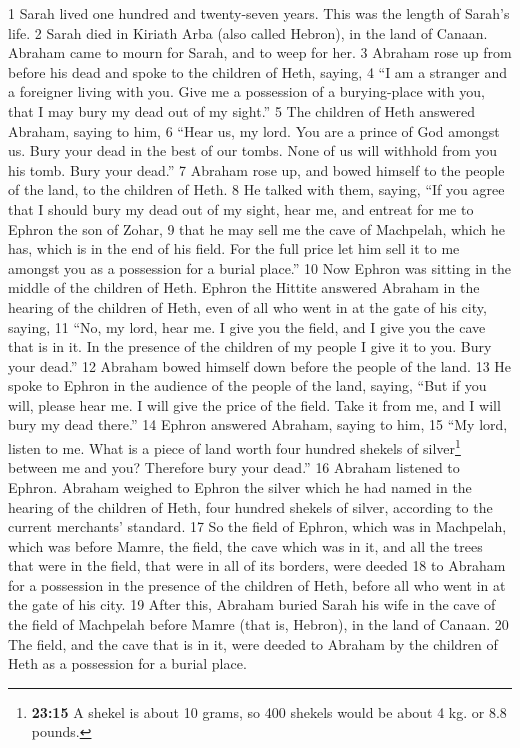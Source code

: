 {1} Sarah lived one hundred and twenty-seven years. This was the length
of Sarah's life. {2} Sarah died in Kiriath Arba (also called Hebron), in
the land of Canaan. Abraham came to mourn for Sarah, and to weep for
her. {3} Abraham rose up from before his dead and spoke to the children
of Heth, saying, {4} ``I am a stranger and a foreigner living with you.
Give me a possession of a burying-place with you, that I may bury my
dead out of my sight.'' {5} The children of Heth answered Abraham,
saying to him, {6} ``Hear us, my lord. You are a prince of God amongst
us. Bury your dead in the best of our tombs. None of us will withhold
from you his tomb. Bury your dead.'' {7} Abraham rose up, and bowed
himself to the people of the land, to the children of Heth. {8} He
talked with them, saying, ``If you agree that I should bury my dead out
of my sight, hear me, and entreat for me to Ephron the son of Zohar, {9}
that he may sell me the cave of Machpelah, which he has, which is in the
end of his field. For the full price let him sell it to me amongst you
as a possession for a burial place.'' {10} Now Ephron was sitting in the
middle of the children of Heth. Ephron the Hittite answered Abraham in
the hearing of the children of Heth, even of all who went in at the gate
of his city, saying, {11} ``No, my lord, hear me. I give you the field,
and I give you the cave that is in it. In the presence of the children
of my people I give it to you. Bury your dead.'' {12} Abraham bowed
himself down before the people of the land. {13} He spoke to Ephron in
the audience of the people of the land, saying, ``But if you will,
please hear me. I will give the price of the field. Take it from me, and
I will bury my dead there.'' {14} Ephron answered Abraham, saying to
him, {15} ``My lord, listen to me. What is a piece of land worth four
hundred shekels of silver\footnote{\textbf{23:15} A shekel is about 10
  grams, so 400 shekels would be about 4 kg. or 8.8 pounds.} between me
and you? Therefore bury your dead.'' {16} Abraham listened to Ephron.
Abraham weighed to Ephron the silver which he had named in the hearing
of the children of Heth, four hundred shekels of silver, according to
the current merchants' standard. {17} So the field of Ephron, which was
in Machpelah, which was before Mamre, the field, the cave which was in
it, and all the trees that were in the field, that were in all of its
borders, were deeded {18} to Abraham for a possession in the presence of
the children of Heth, before all who went in at the gate of his city.
{19} After this, Abraham buried Sarah his wife in the cave of the field
of Machpelah before Mamre (that is, Hebron), in the land of Canaan. {20}
The field, and the cave that is in it, were deeded to Abraham by the
children of Heth as a possession for a burial place.

